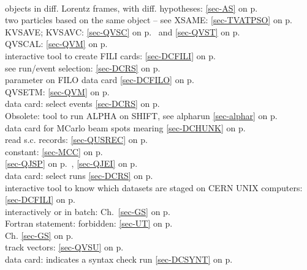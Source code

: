  \\
 \mysubitem objects in diff. Lorentz frames, with diff. hypotheses:
 \ref{sec-AS} on p.~\pageref{sec-AS}\\
 \mysubitem  two particles based on the same object -- see
 XSAME:
 \ref{sec-TVATPSO} on p.~\pageref{sec-TVATPSO}\\
 KVSAVE; KVSAVC: \ref{sec-QVSC} on p.~\pageref{sec-QVSC} and
 \ref{sec-QVST} on p.~\pageref{sec-QVST}\\
 QVSCAL: \ref{sec-QVM} on p.~\pageref{sec-QVM}\\
 interactive tool to create FILI cards: \ref{sec-DCFILI} on p.~\pageref{sec-DCFILI}\\
 see run/event selection: \ref{sec-DCRS} on p.~\pageref{sec-DCRS}\\
 parameter on FILO data card \ref{sec-DCFILO} on p.~\pageref{sec-DCFILO}\\
 QVSETM: \ref{sec-QVM} on p.~\pageref{sec-QVM}\\
 data card: select events \ref{sec-DCRS} on p.~\pageref{sec-DCRS}\\
 Obsolete: tool to run ALPHA on SHIFT, see alpharun
 \ref{sec-alphar} on p.~\pageref{sec-alphar}\\
 data card for MCarlo beam spots mearing \ref{sec-DCHUNK} on p.~\pageref{sec-DCHUNK}\\
 read s.c. records: \ref{sec-QUSREC} on p.~\pageref{sec-QUSREC}\\
 constant: \ref{sec-MCC} on p.~\pageref{sec-MCC}\\
 \ref{sec-QJSP} on p.~\pageref{sec-QJSP}, \ref{sec-QJEI}
 on p.~\pageref{sec-QJEI}\\
 data card: select runs \ref{sec-DCRS} on p.~\pageref{sec-DCRS}\\
 interactive tool to know which datasets are staged on CERN UNIX computers:
                           \ref{sec-DCFILI} on p.~\pageref{sec-DCFILI}\\
 interactively or in batch: Ch.~\ref{sec-GS} on p.~\pageref{sec-GS}\\
 Fortran statement: forbidden:
 \ref{sec-UT} on p.~\pageref{sec-UT}\\
 Ch. \ref{sec-GS} on p.~\pageref{sec-GS}\\
 track vectors: \ref{sec-QVSU} on p.~\pageref{sec-QVSU}\\
 data card: indicates a syntax check run
 \ref{sec-DCSYNT} on p.~\pageref{sec-DCSYNT}
 
